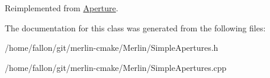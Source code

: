 Reimplemented from \hyperlink{classAperture_aff2f276b93bb2cb94e559e1c4901e38e}{Aperture}.



The documentation for this class was generated from the following files\+:\begin{DoxyCompactItemize}
\item 
/home/fallon/git/merlin-\/cmake/\+Merlin/Simple\+Apertures.\+h\item 
/home/fallon/git/merlin-\/cmake/\+Merlin/Simple\+Apertures.\+cpp\end{DoxyCompactItemize}

